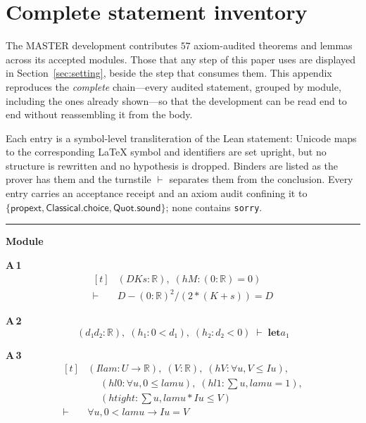 \appendices
\section{Complete statement inventory}
\label{app:inventory}

The MASTER development contributes $57$ axiom-audited theorems and lemmas across its accepted modules. Those that any step of this paper uses are displayed in Section~\ref{sec:setting}, beside the step that consumes them. This appendix reproduces the \emph{complete} chain---every audited statement, grouped by module, including the ones already shown---so that the development can be read end to end without reassembling it from the body.

Each entry is a symbol-level transliteration of the Lean statement: Unicode maps to the corresponding \LaTeX{} symbol and identifiers are set upright, but no structure is rewritten and no hypothesis is dropped. Binders are listed as the prover has them and the turnstile $\vdash$ separates them from the conclusion. Every entry carries an acceptance receipt and an axiom audit confining it to $\{\textsf{propext},\textsf{Classical.choice},\textsf{Quot.sound}\}$; none contains \texttt{sorry}.

\vspace{4pt}\noindent\rule{\columnwidth}{0.4pt}\par\vspace{2pt}
\noindent\textbf{Module }\par\vspace{3pt}

\noindent\textbf{A\,1}\quad{}
{\footnotesize\[ \begin{aligned}[t]
&(\mathit{D} \mathit{K} \mathit{s} : \mathbb{R} ),\; (\mathit{hM} : (0:\mathbb{R} ) = 0)\\
\vdash\;&\mathit{D} - (0:\mathbb{R} )^{2}/(2*(\mathit{K} + \mathit{s})) = \mathit{D}
\end{aligned} \]}

\noindent\textbf{A\,2}\quad{}
{\footnotesize\[ (\mathit{d₁} \mathit{d₂} : \mathbb{R} ),\; (\mathit{h₁} : 0 < \mathit{d₁}),\; (\mathit{h₂} : \mathit{d₂} < 0) \;\vdash\; \mathbf{let} \mathit{a₁} \]}

\noindent\textbf{A\,3}\quad{}
{\footnotesize\[ \begin{aligned}[t]
&(\mathit{I} \mathit{lam} : \mathit{U} \to \mathbb{R} ),\; (\mathit{V} : \mathbb{R} ),\; (\mathit{hV} : \forall \mathit{u}, \mathit{V} \leq \mathit{I} \mathit{u}),\\
&\quad \; (\mathit{hl0} : \forall \mathit{u}, 0 \leq \mathit{lam} \mathit{u}),\; (\mathit{hl1} : \textstyle\sum \mathit{u}, \mathit{lam} \mathit{u} = 1),\\
&\quad \; (\mathit{htight} : \textstyle\sum \mathit{u}, \mathit{lam} \mathit{u} * \mathit{I} \mathit{u} \leq \mathit{V})\\
\vdash\;&\forall \mathit{u}, 0 < \mathit{lam} \mathit{u} \to \mathit{I} \mathit{u} = \mathit{V}
\end{aligned} \]}

